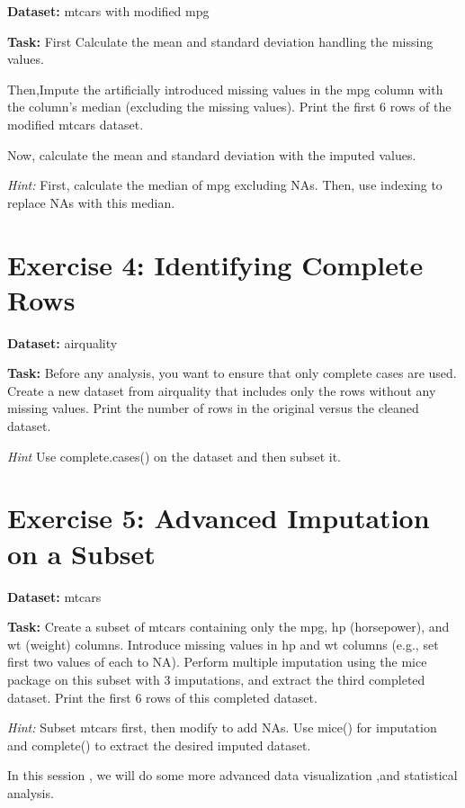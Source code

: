 \documentclass[
]{book}
\begin{document}
\textbf{Dataset:} mtcars with modified mpg

\textbf{Task:} First Calculate the mean and standard deviation handling the
missing values.

Then,Impute the artificially introduced missing values in the mpg column
with the column's median (excluding the missing values). Print the first
6 rows of the modified mtcars dataset.

Now, calculate the mean and standard deviation with the imputed values.

\emph{Hint:} First, calculate the median of mpg excluding NAs. Then, use
indexing to replace NAs with this median.

\section*{Exercise 4: Identifying Complete Rows}\label{exercise-4-identifying-complete-rows}

\textbf{Dataset:} airquality

\textbf{Task:} Before any analysis, you want to ensure that only complete
cases are used. Create a new dataset from airquality that includes only
the rows without any missing values. Print the number of rows in the
original versus the cleaned dataset.

\emph{Hint} Use complete.cases() on the dataset and then subset it.

\section*{Exercise 5: Advanced Imputation on a Subset}\label{exercise-5-advanced-imputation-on-a-subset}

\textbf{Dataset:} mtcars

\textbf{Task:} Create a subset of mtcars containing only the mpg, hp
(horsepower), and wt (weight) columns. Introduce missing values in hp
and wt columns (e.g., set first two values of each to NA). Perform
multiple imputation using the mice package on this subset with 3
imputations, and extract the third completed dataset. Print the first 6
rows of this completed dataset.

\emph{Hint:} Subset mtcars first, then modify to add NAs. Use mice() for
imputation and complete() to extract the desired imputed dataset.

In this session , we will do some more advanced data visualization ,and statistical analysis.
\end{document}
